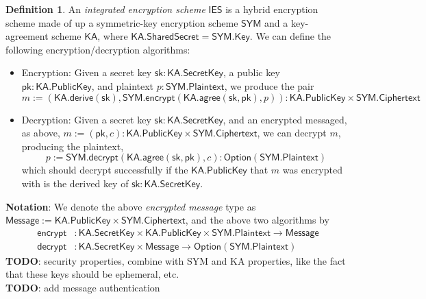 \documentclass[a4paper]{article}
\newcommand{\TODO}[1]{{\color{red}\textbf{TODO}}: #1}
\theoremstyle{definition}
\newtheorem{definition}{Definition}[subsection]
\newcommand{\Ciphertext}{{\textsf{Ciphertext}}}
\newcommand{\IES}{{\textsf{IES}}}
\newcommand{\KA}{{\textsf{KA}}}
\newcommand{\Key}{{\textsf{Key}}}
\newcommand{\Message}{{\textsf{Message}}}
\newcommand{\Option}{{\textsf{Option}}}
\newcommand{\Plaintext}{{\textsf{Plaintext}}}
\newcommand{\PublicKey}{{\textsf{PublicKey}}}
\newcommand{\SYM}{{\textsf{SYM}}}
\newcommand{\SecretKey}{{\textsf{SecretKey}}}
\newcommand{\SharedSecret}{{\textsf{SharedSecret}}}
\newcommand{\agree}{{\textsf{agree}}}
\newcommand{\decrypt}{{\textsf{decrypt}}}
\newcommand{\derive}{{\textsf{derive}}}
\newcommand{\encrypt}{{\textsf{encrypt}}}
\newcommand{\pk}{{\textsf{pk}}}
\newcommand{\sk}{{\textsf{sk}}}
\begin{document}
\begin{definition}
    An \emph{integrated encryption scheme} $\IES$ is a hybrid encryption scheme made of up a symmetric-key encryption scheme $\SYM$ and a key-agreement scheme $\KA$, where $\KA.\SharedSecret = \SYM.\Key$. We can define the following encryption/decryption algorithms:
    \begin{itemize}
        \item Encryption: Given a secret key $\sk: \KA.\SecretKey$, a public key $\pk: \KA.\PublicKey$, and plaintext $p : \SYM.\Plaintext$, we produce the pair
            \[m := (\KA.\derive(\sk), \SYM.\encrypt(\KA.\agree(\sk, \pk), p)) : \KA.\PublicKey \times \SYM.\Ciphertext\]
        \item Decryption: Given a secret key $\sk : \KA.\SecretKey$, and an encrypted messaged, as above, $m := (\pk, c) : \KA.\PublicKey \times \SYM.\Ciphertext$, we can decrypt $m$, producing the plaintext,
            \[p := \SYM.\decrypt(\KA.\agree(\sk, \pk), c) : \Option(\SYM.\Plaintext)\]
            which should decrypt successfully if the $\KA.\PublicKey$ that $m$ was encrypted with is the derived key of $\sk : \KA.\SecretKey$.
    \end{itemize}

    \textbf{Notation}: We denote the above \emph{encrypted message} type as $\Message := \KA.\PublicKey \times \SYM.\Ciphertext$, and the above two algorithms by
    \begin{align*}
        \encrypt &: \KA.\SecretKey \times \KA.\PublicKey \times \SYM.\Plaintext \to \Message \\
        \decrypt &: \KA.\SecretKey \times \Message \to \Option(\SYM.\Plaintext)
    \end{align*}
    \TODO{security properties, combine with \SYM{} and \KA{} properties, like the fact that these keys should be ephemeral, etc.} \\
    \TODO{add message authentication}
\end{definition}

\newcommand{\Prob}[2]{\mathrm{Pr}\scalebox{0.88}{\ensuremath{
  \left[\!\!\begin{array}{c}#1\end{array} \middle| \begin{array}{l}#2\end{array}\!\!\right]
}}}
\end{document}
